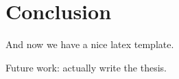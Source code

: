 \chapter{Conclusion}

And now we have a nice latex template.

Future work: actually write the thesis.